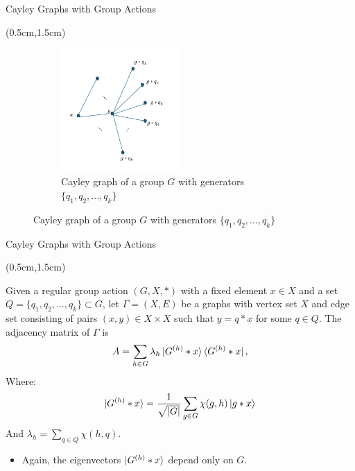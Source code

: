 \documentclass{beamer}
\theoremstyle{definition}
\begin{document}
\begin{frame}{Cayley Graphs with Group Actions}
    \begin{textblock*}{12cm}(0.5cm,1.5cm)

        \begin{figure}
            \begin{figure}[h!]
                \centering
                \includegraphics[width=0.5\textwidth]{fig_2.png}  %
                \caption{Cayley graph of a group $G$ with generators $\{q_1, q_2, ... , q_k\}$}
                \label{fig:cayley_z6}
            \end{figure}
        \end{figure}

    
    \end{textblock*}
\end{frame}






\begin{frame}{Cayley Graphs with Group Actions}
    \begin{textblock*}{12cm}(0.5cm,1.5cm)

    
    Given a regular group action $(G, X, *)$ with a fixed element $x \in X$ and a set  $Q = \{q_1, q_2, \dots, q_k\} \subset G$, let $\Gamma = (X, E)$ be a graphs with vertex set $X$ and edge set consisting of pairs $(x, y) \in X \times X$ such that $y = q * x$ for some $q \in Q$. The adjacency matrix of $\Gamma$ is
    \[
    A = \sum_{h \in G} \lambda_h \ket{G^{(h)} * x} \bra{G^{(h)} * x}, 
    \]
    Where:
    \[
        \ket{G^{(h)} * x} = \frac{1}{\sqrt{|G|}}\sum_{g \in G}\chi(g,h)\ket{g*x}
    \]
    And $\lambda_h = \sum_{q \in Q} \chi(h, q)$. 
    \vspace{0.5cm}
    \begin{itemize}
        \item Again, the eigenvectors $\ket{G^{(h)} * x}$ depend only on $G$.
    \end{itemize}
    \end{textblock*}
\end{frame}
\end{document}
